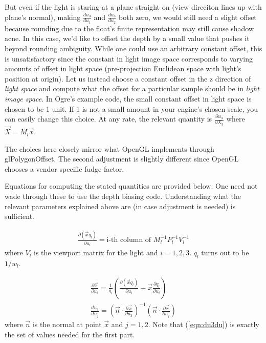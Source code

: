 \documentclass[]{article}  %
\begin{document}
But even if the light is staring at a plane straight on (view direciton lines up with plane's normal), making $\frac{du_3}{du_1}$ and $\frac{du_3}{du_2}$ both zero, we would still need a slight offset because rounding due to the float's finite representation may still cause shadow acne.  In this case, we'd like to offset the depth by a small value that pushes it beyond rounding ambiguity.  While one could use an arbitrary constant offset, this is unsatisfactory since the constant in light image space corresponds to varying amounts of offset in light space (pre-projection Euclidean space with light's position at origin).  Let us instead choose a constant offset in the z direction of {\em light space} and compute what the offset for a particular sample should be in {\em light image space}.  In Ogre's example code, the small constant offset in light space is chosen to be 1 unit.  If 1 is not a small amount in your engine's chosen scale, you can easily change this choice.  At any rate, the relevant quantity is $\frac{\partial u_3}{\partial X_3}$ where $\vec{X} = M_l \vec{x}$.

The choices here closely mirror what OpenGL implements through glPolygonOffset.  The second adjustment is slightly different since OpenGL chooses a vendor specific fudge factor.  

Equations for computing the stated quantities are provided below.  One need not wade through these to use the depth biasing code.  Understanding what the relevant parameters explained above are (in case adjustment is needed) is sufficient.

\begin{eqnarray}  
\label{eqn:dxqdu}
  \frac{\partial (\vec{x} q_l)}{\partial u_i} = \mbox{i-th column of } M_l^{-1} P_l^{-1} V_l^{-1} 
\end{eqnarray}
where $V_l$ is the viewport matrix for the light and $i=1,2,3$.  $q_l$ turns out to be $1/w_l$.

\begin{eqnarray} 
\label{eqn:dxdu}
  \frac{\partial \vec{x}}{\partial u_i} = \frac{1}{q_l} \left( \frac{\partial (\vec{x} q_l)}{\partial u_i} - \vec{x}\frac{\partial q_l}{\partial u_i} \right) \\
\label{eqn:du3du}
  \frac{du_3}{du_j} = \left( \vec{n} \cdot \frac{\partial \vec{x}}{\partial u_3} \right)^{-1} \left( \vec{n} \cdot \frac{\partial \vec{x}}{\partial u_j} \right)
\end{eqnarray}
where $\vec{n}$ is the normal at point $\vec{x}$ and $j=1,2$.  Note that (\ref{eqn:du3du}) is exactly the set of values needed for the first part.
\end{document}
